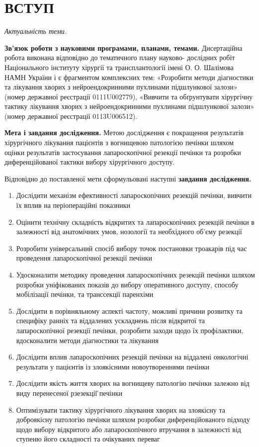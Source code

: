 \chapter{ВСТУП}



\textit{Актуальність теми.} 




\textbf{Зв’язок роботи з науковими програмами, планами, темами.}
Дисертаційна робота виконана відповідно до тематичного плану науково- дослідних робіт Національного інституту хірургії та трансплантології імені О. О. Шалімова НАМН України і є фрагментом комплексних тем: «Розробити методи діагностики та лікування хворих з нейроендокринними пухлинами підшлункової залози» (номер державної реєстрації 0111U002779), «Вивчити та обґрунтувати хірургічну тактику лікування хворих з нейроендокринними пухлинами підшлункової залози» (номер державної реєстрації 0113U006512).

\textbf{Мета і завдання дослідження.} Метою дослідження є покращення результатів хірургічного лікування пацієнтів з вогнищевою патологією печінки шляхом оцінки результатів застосування лапароскопічної резекції печінки та розробки диференційованої тактики вибору хірургічного доступу. 

Відповідно до поставленої мети сформульовані наступні \textbf{завдання дослідження.}
\begin{enumerate}
    \item Дослідити механізм ефективності лапароскопічних резекцій печінки, вивчити їх вплив на періопераційні показники
    \item Оцінити технічну складність відкритих та лапароскопічних резекцій печінки в залежності від анатомічних умов, нозології та необхідного об’єму резекції
    \item Розробити універсальний спосіб вибору точок постановки троакарів під час проведення лапароскопічної резекції печінки
    \item Удосконалити методику проведення лапароскопічних резекцій печінки шляхом розробки уніфікованих показів до вибору оперативного доступу, способу мобілізації печінки, та транссекції паренхіми
    \item Дослідити в порівняльному аспекті частоту, можливі причини розвитку та специфіку ранніх та віддалених ускладнень після відкритої та лапароскопічної резекції печінки, розробити заходи щодо їх профілактики, вдосконалити методи діагностики та лікування
    \item Дослідити вплив лапароскопічних резекцій печінки на віддалені онкологічні  результати у пацієнтів із злоякісними новоутвореннями печінки
    \item Дослідити якість життя хворих на вогнищеву патологію печінки залежно від виду перенесеної рзезекції̈ печінки
    \item Оптимізувати тактику хірургічного лікування хворих на злоякісну та доброякісну патологію печінки шляхом розробки диференційованого підходу щодо вибору відкритого або лапароскопічного втручання в залежності від ступеню його складності та очікуваних переваг
\end{enumerate}


